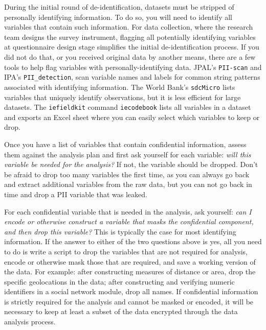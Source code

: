 During the initial round of de-identification, 
datasets must be stripped of personally identifying information.
To do so, you will need to identify all variables that contain
such information.
For data collection, where the research team designs the survey instrument,
flagging all potentially identifying variables at questionnaire design stage
simplifies the initial de-identification process.
If you did not do that, or you received original data by another means,
there are a few tools to help flag variables with personally-identifying data.
JPAL's \texttt{PII-scan} and
IPA's \texttt{PII\_detection},
scan variable names and labels for common string patterns associated with identifying information.
The World Bank's \texttt{sdcMicro}
lists variables that uniquely identify observations, 
but it is less efficient for large datasets.
The \texttt{iefieldkit} command \texttt{iecodebook}
lists all variables in a dataset and exports an Excel sheet
where you can easily select which variables to keep or drop.

Once you have a list of variables that contain confidential information,
assess them against the analysis plan and first ask yourself for each variable:
\textit{will this variable be needed for the analysis?}
If not, the variable should be dropped.
Don't be afraid to drop too many variables the first time,
as you can always go back and extract additional variables from the raw data,
but you can not go back in time and drop a PII variable that was leaked.

For each confidential variable that is needed in the analysis, ask yourself:
\textit{can I encode or otherwise construct a variable that masks the confidential component, and
	then drop this variable?}
This is typically the case for most identifying information.
If the answer to either of the two questions above is yes,
all you need to do is write a script to drop the variables that are not required for analysis,
encode or otherwise mask those that are required,
and save a working version of the data.
For example:
after constructing measures of distance or area,
drop the specific geolocations in the data; 
after constructing and verifying numeric identifiers in 
a social network module, drop all names. 
If confidential information is strictly required for the analysis and cannot be
masked or encoded,
it will be necessary to keep at least a subset of the data encrypted through
the data analysis process.

